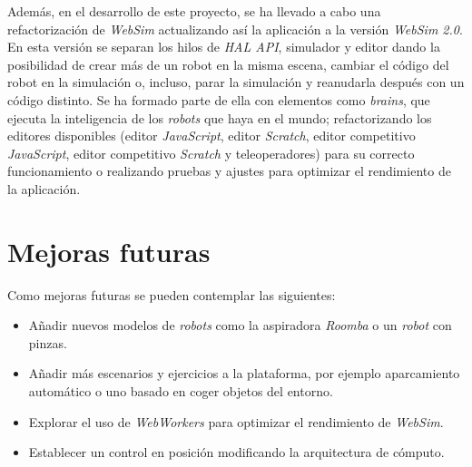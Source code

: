 Además, en el desarrollo de este proyecto, se ha llevado a cabo una refactorización de \textit{WebSim} actualizando así la aplicación a la versión \textit{WebSim 2.0}. En esta versión se separan los hilos de \textit{HAL API}, simulador y editor dando la posibilidad de crear más de un robot en la misma escena, cambiar el código del robot en la simulación o, incluso, parar la simulación y reanudarla después con un código distinto. Se ha formado parte de ella con elementos como \textit{brains}, que ejecuta la inteligencia de los \textit{robots} que haya en el mundo; refactorizando los editores disponibles (editor \textit{JavaScript}, editor \textit{Scratch}, editor competitivo \textit{JavaScript}, editor competitivo \textit{Scratch} y teleoperadores) para su correcto funcionamiento o realizando pruebas y ajustes para optimizar el rendimiento de la aplicación.

\section{Mejoras futuras}
\label{sec:mejoras_futuras}

Como mejoras futuras se pueden contemplar las siguientes:
\begin{itemize}
    \item Añadir nuevos modelos de \textit{robots} como la aspiradora \textit{Roomba} o un \textit{robot} con pinzas. 
    \item Añadir más escenarios y ejercicios a la plataforma, por ejemplo aparcamiento automático o uno basado en coger objetos del entorno. 
    \item Explorar el uso de \textit{WebWorkers} para optimizar el rendimiento de \textit{WebSim}.
    \item Establecer un control en posición modificando la arquitectura de cómputo.
\end{itemize}